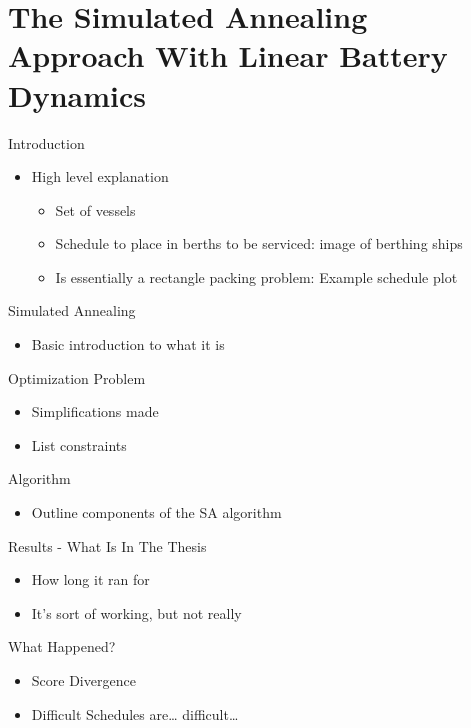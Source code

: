 \documentclass[bigger]{beamer}
\begin{document}
\section{The Simulated Annealing Approach With Linear Battery Dynamics}
\label{sec:org8bb97b5}
\begin{frame}[label={sec:org0d58bb9}]{Introduction}
\begin{itemize}
\item High level explanation
\begin{itemize}
\item Set of vessels
\item Schedule to place in berths to be serviced: image of berthing ships
\item Is essentially a rectangle packing problem: Example schedule plot
\end{itemize}
\end{itemize}
\end{frame}
\begin{frame}[label={sec:orgdab8638}]{Simulated Annealing}
\begin{itemize}
\item Basic introduction to what it is
\end{itemize}
\end{frame}
\begin{frame}[label={sec:orgd9a0677}]{Optimization Problem}
\begin{itemize}
\item Simplifications made
\item List constraints
\end{itemize}
\end{frame}
\begin{frame}[label={sec:org2f2c4e7}]{Algorithm}
\begin{itemize}
\item Outline components of the SA algorithm
\end{itemize}
\end{frame}
\begin{frame}[label={sec:org2ea4f73}]{Results - What Is In The Thesis}
\begin{itemize}
\item How long it ran for
\item It's sort of working, but not really
\end{itemize}
\end{frame}
\begin{frame}[label={sec:org6dd5a9c}]{What Happened?}
\begin{itemize}
\item Score Divergence
\item Difficult Schedules are\ldots{} difficult\ldots{}
\end{itemize}
\end{frame}
\end{document}
